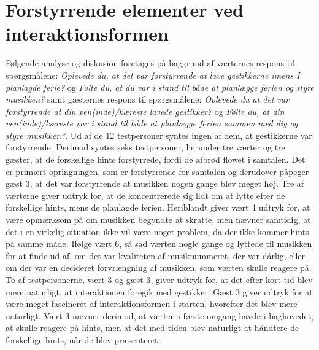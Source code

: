 \section{Forstyrrende elementer ved interaktionsformen}
\label{TestresultaterSocialAcceptForstyrrende}
%
Følgende analyse og diskusion foretages på baggrund af værternes respons til spørgsmålene: \textit{Oplevede du, at det var forstyrrende at lave gestikkerne imens I planlagde ferie?} og \textit{Følte du, at du var i stand til både at planlægge ferien og styre musikken?} samt gæsternes respons til spørgsmålene: \textit{Oplevede du at det var forstyrrende at din ven(inde)/kæreste lavede gestikker?} og \textit{Følte du, at din ven(inde)/kæreste var i stand til både at planlægge ferien sammen med dig og styre musikken?}. \blankline
%
Ud af de 12 testpersoner syntes ingen af dem, at gestikkerne var forstyrrende. Derimod syntes seks testpersoner, herunder tre værter og tre gæster, at de forskellige hints forstyrrede, fordi de afbrød flowet i samtalen. Det er primært opringningen, som er forstyrrende for samtalen og derudover påpeger gæst 3, at det var forstyrrende at musikken nogen gange blev meget høj. Tre af værterne giver udtryk for, at de koncentrerede sig lidt om at lytte efter de forskellige hints, mens de planlagde ferien. Heriblandt giver vært 4 udtryk for, at være opmærksom på om musikken begyndte at skratte, men nævner samtidig, at det i en virkelig situation ikke vil være noget problem, da der ikke kommer hints på samme måde. Ifølge vært 6, så sad værten nogle gange og lyttede til musikken for at finde ud af, om det var kvaliteten af musiknummeret, der var dårlig, eller om der var en decideret forvrængning af musikken, som værten skulle reagere på. To af testpersonerne, vært 3 og gæst 3, giver udtryk for, at det efter kort tid blev mere naturligt, at interaktionen foregik med gestikker. Gæst 3 giver udtryk for at være meget fascineret af interaktionsformen i starten, hvorefter det blev mere naturligt. Vært 3 nævner derimod, at værten i første omgang havde i baghovedet, at skulle reagere på hints, men at det med tiden blev naturligt at håndtere de forskellige hints, når de blev præsenteret. 

